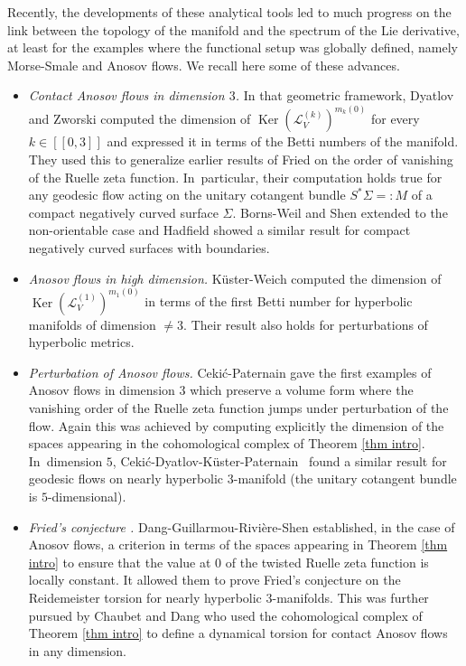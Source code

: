 \documentclass[11pt]{article}
\newcommand{\lcr}{[\![}
\newcommand{\rcr}{]\!]}
\theoremstyle{definition}
\theoremstyle{plain}
\newcommand{\Lie}{\mathcal{L}}
\DeclareMathOperator{\Ker}{Ker}
\begin{document}
Recently, the developments of these analytical tools led to much progress on the link between the topology of the manifold and the spectrum of the Lie derivative, at least for the examples where the functional setup was globally defined, namely Morse-Smale and Anosov flows. We recall here some of these advances.
\begin{itemize}
\item \emph{Contact Anosov flows in dimension $3$.} In that geometric framework, Dyatlov and Zworski \cite{dyatlov-zworski_2017} computed the dimension of $\Ker (\Lie_V^{(k)})^{m_k(0)}$ for every $k\in\lcr0,3\rcr$ and expressed it in terms of the Betti numbers of the manifold. They used this to generalize earlier results of Fried \cite{fried_lefschetz} on the order of vanishing of the Ruelle zeta function. In~particular, their computation holds true for any geodesic flow acting on the unitary cotangent bundle $S^*\Sigma =: M$ of a compact negatively curved surface $\Sigma$. Borns-Weil and Shen \cite{borns-weil-shen} extended \cite{dyatlov-zworski_2017} to the non-orientable case and Hadfield \cite{hadfield} showed a similar result for compact negatively curved surfaces with boundaries.
\item \emph{Anosov flows in high dimension.} Küster-Weich \cite{kuster-weich} computed the dimension of $\Ker (\Lie_V^{(1)})^{m_1(0)}$ in terms of the first Betti number for hyperbolic manifolds of dimension $\neq 3$. Their result also holds for perturbations of hyperbolic metrics.
\item \emph{Perturbation of Anosov flows.} Ceki\'{c}-Paternain \cite{cekic-paternain} gave the first examples of Anosov flows in dimension $3$ which preserve a volume form where the vanishing order of the Ruelle zeta function jumps under perturbation of the flow. Again this was achieved by computing explicitly the dimension of the spaces appearing in the cohomological complex of Theorem \ref{thm intro}. In~dimension $5$, Ceki\'{c}-Dyatlov-Küster-Paternain~\cite{CDKP} found a similar result for geodesic flows on nearly hyperbolic $3$-manifold (the unitary cotangent bundle is $5$-dimensional).
\item \emph{Fried's conjecture \cite{fried_lefschetz,fried_meromorphic}.} Dang-Guillarmou-Rivière-Shen \cite{DGRS} established, in the case of Anosov flows, a criterion in terms of the spaces appearing in Theorem \ref{thm intro} to ensure that the value at $0$ of the twisted Ruelle zeta function is locally constant. It allowed them to prove Fried's conjecture on the Reidemeister torsion for nearly hyperbolic $3$-manifolds. This was further pursued by Chaubet and Dang \cite{chaubet-dang} who used the cohomological complex of Theorem \ref{thm intro} to define a dynamical torsion for contact Anosov flows in any dimension.

\end{itemize}
\end{document}
